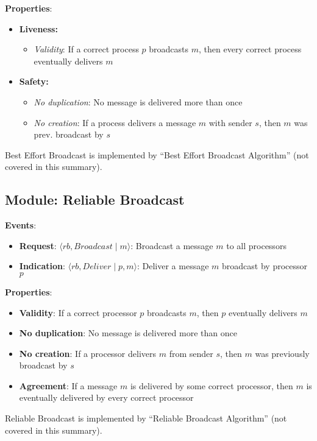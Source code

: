 \documentclass[12pt,A4]{extarticle}
\begin{document}
\textbf{Properties}:
\begin{itemize}
  \item{\textbf{Liveness:}
              \begin{itemize}
                \item{\textit{Validity}: If a correct process $p$ broadcasts $m$, then every correct process eventually delivers $m$}
              \end{itemize}
        }
  \item{\textbf{Safety:}
              \begin{itemize}
                \item{\textit{No duplication}: No message is delivered more than once}
                \item{\textit{No creation}: If a process delivers a message $m$ with sender $s$, then $m$ was prev. broadcast by $s$}
              \end{itemize}}
\end{itemize}
Best Effort Broadcast is implemented by ``Best Effort Broadcast Algorithm'' (not covered in this summary).

\subsection{Module: Reliable Broadcast}
\textbf{Events}:
\begin{itemize}
  \item{\textbf{Request}: $\langle rb, \textit{Broadcast} \mid m \rangle$: Broadcast a message $m$ to all processors}
  \item{\textbf{Indication}: $\langle rb, \textit{Deliver} \mid p, m \rangle$: Deliver a message $m$ broadcast by processor $p$}
\end{itemize}

\textbf{Properties}:
\begin{itemize}
  \item{\textbf{Validity}: If a correct processor $p$ broadcasts $m$, then $p$ eventually delivers $m$}
  \item{\textbf{No duplication}: No message is delivered more than once}
  \item{\textbf{No creation}: If a processor delivers $m$ from sender $s$, then $m$ was previously broadcast by $s$}
  \item{\textbf{Agreement}: If a message $m$ is delivered by some correct processor, then $m$ is eventually delivered by every correct processor}
\end{itemize}
Reliable Broadcast is implemented by ``Reliable Broadcast Algorithm'' (not covered in this summary).
\end{document}
